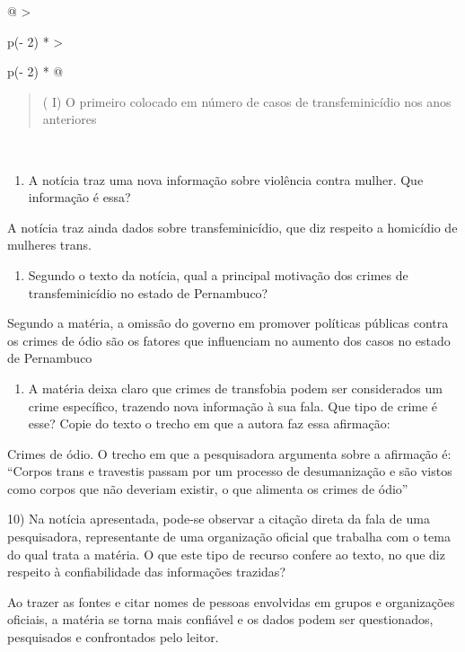 {\begin{longtable}[]{@{}
  >{\raggedright\arraybackslash}p{(\columnwidth - 2\tabcolsep) * }
  >{\raggedright\arraybackslash}p{(\columnwidth - 2\tabcolsep) * }@{}}
\begin{minipage}[t]{\linewidth}
\begin{quote}
( I) O primeiro colocado em número de casos de transfeminicídio nos anos
anteriores
\end{quote}
\end{minipage} \\
\bottomrule
\end{longtable}

\begin{enumerate}
\def\labelenumi{\arabic{enumi}.}
\tightlist
\item
  A notícia traz uma nova informação sobre violência contra mulher. Que
  informação é essa?
\end{enumerate}

A notícia traz ainda dados sobre transfeminicídio, que diz respeito a
homicídio de mulheres trans.

\begin{enumerate}
\def\labelenumi{\arabic{enumi}.}
\tightlist
\item
  Segundo o texto da notícia, qual a principal motivação dos crimes de
  transfeminicídio no estado de Pernambuco?
\end{enumerate}

Segundo a matéria, a omissão do governo em promover políticas públicas
contra os crimes de ódio são os fatores que influenciam no aumento dos
casos no estado de Pernambuco

\begin{enumerate}
\def\labelenumi{\arabic{enumi}.}
\tightlist
\item
  A matéria deixa claro que crimes de transfobia podem ser considerados
  um crime específico, trazendo nova informação à sua fala. Que tipo de
  crime é esse? Copie do texto o trecho em que a autora faz essa
  afirmação:
\end{enumerate}

Crimes de ódio. O trecho em que a pesquisadora argumenta sobre a
afirmação é: ``Corpos trans e travestis passam por um processo de
desumanização e são vistos como corpos que não deveriam existir, o que
alimenta os crimes de ódio''

10) Na notícia apresentada, pode-se observar a citação direta da fala de
uma pesquisadora, representante de uma organização oficial que trabalha
com o tema do qual trata a matéria. O que este tipo de recurso confere
ao texto, no que diz respeito à confiabilidade das informações trazidas?

Ao trazer as fontes e citar nomes de pessoas envolvidas em grupos e
organizações oficiais, a matéria se torna mais confiável e os dados
podem ser questionados, pesquisados e confrontados pelo leitor.

}
